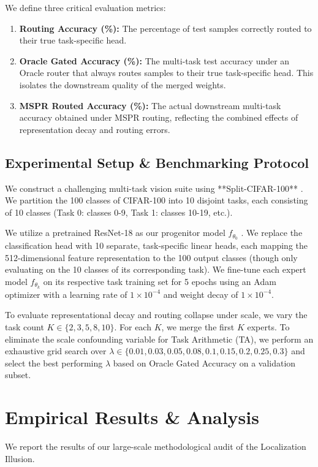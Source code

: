 \documentclass{article}
\theoremstyle{plain}
\theoremstyle{definition}
\theoremstyle{remark}
\begin{document}
We define three critical evaluation metrics:
\begin{enumerate}
    \item \textbf{Routing Accuracy (\%):} The percentage of test samples correctly routed to their true task-specific head.
    \item \textbf{Oracle Gated Accuracy (\%):} The multi-task test accuracy under an Oracle router that always routes samples to their true task-specific head. This isolates the downstream quality of the merged weights.
    \item \textbf{MSPR Routed Accuracy (\%):} The actual downstream multi-task accuracy obtained under MSPR routing, reflecting the combined effects of representation decay and routing errors.
\end{enumerate}

\subsection{Experimental Setup \& Benchmarking Protocol}
We construct a challenging multi-task vision suite using **Split-CIFAR-100** \cite{Ruder2017AnOO, Crawshaw2020MultiTaskLW}. We partition the 100 classes of CIFAR-100 into 10 disjoint tasks, each consisting of 10 classes (Task 0: classes 0-9, Task 1: classes 10-19, etc.).

We utilize a pretrained ResNet-18 as our progenitor model $f_{\theta_0}$ \cite{He2024LocalizeandStitchEM}. We replace the classification head with 10 separate, task-specific linear heads, each mapping the 512-dimensional feature representation to the 100 output classes (though only evaluating on the 10 classes of its corresponding task). We fine-tune each expert model $f_{\theta_k}$ on its respective task training set for 5 epochs using an Adam optimizer with a learning rate of $1\times 10^{-4}$ and weight decay of $1\times 10^{-4}$.

To evaluate representational decay and routing collapse under scale, we vary the task count $K \in \{2, 3, 5, 8, 10\}$. For each $K$, we merge the first $K$ experts. To eliminate the scale confounding variable for Task Arithmetic (TA), we perform an exhaustive grid search over $\lambda \in \{0.01, 0.03, 0.05, 0.08, 0.1, 0.15, 0.2, 0.25, 0.3\}$ and select the best performing $\lambda$ based on Oracle Gated Accuracy on a validation subset.

\section{Empirical Results \& Analysis}
We report the results of our large-scale methodological audit of the Localization Illusion.
\end{document}
